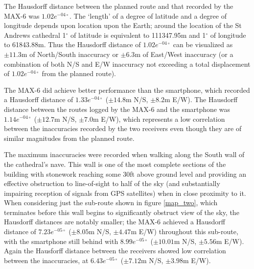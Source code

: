 The Hausdorff distance between the planned route and that recorded by the MAX-6 was $1.02e^{-04\circ}$. The `length' of a degree of latitude and a degree of longitude depends upon location upon the Earth; around the location of the St Andrews cathedral 1$^\circ$ of latitude is equivalent to 111347.95m and 1$^\circ$ of longitude to 61843.88m. Thus the Hausdorff distance of $1.02e^{-04\circ}$ can be visualized as $\pm11.3$m of North/South inaccuracy or $\pm6.3$m of East/West inaccuracy (or a combination of both N/S and E/W inaccuracy not exceeding a total displacement of $1.02e^{-04\circ}$ from the planned route).

The MAX-6 did achieve better performance than the smartphone, which recorded a Hausdorff distance of $1.33e^{-04\circ}$ ($\pm14.8$m N/S, $\pm8.2$m E/W). The Hausdorff distance between the routes logged by the MAX-6 and the smartphone was $1.14e^{-04\circ}$ ($\pm12.7$m N/S, $\pm7.0$m E/W), which represents a low correlation between the inaccuracies recorded by the two receivers even though they are of similar magnitudes from the planned route.

The maximum inaccuracies were recorded when walking along the South wall of the cathedral's nave. This wall is one of the most complete sections of the building with stonework reaching some 30ft above ground level and providing an effective obstruction to line-of-sight to half of the sky (and substantially impairing reception of signals from GPS satellites) when in close proximity to it. When considering just the sub-route shown in figure \ref{map_two}, which terminates before this wall begins to significantly obstruct view of the sky, the Hausdorff distances are notably smaller; the MAX-6 achieved a Hausdorff distance of $7.23e^{-05\circ}$ ($\pm8.05$m N/S, $\pm4.47$m E/W) throughout this sub-route, with the smartphone still behind with $8.99e^{-05\circ}$ ($\pm10.01$m N/S, $\pm5.56$m E/W). Again the Hausforff distance between the receivers showed low correlation between the inaccuracies, at $6.43e^{-05\circ}$ ($\pm7.12$m N/S, $\pm3.98$m E/W).
 

